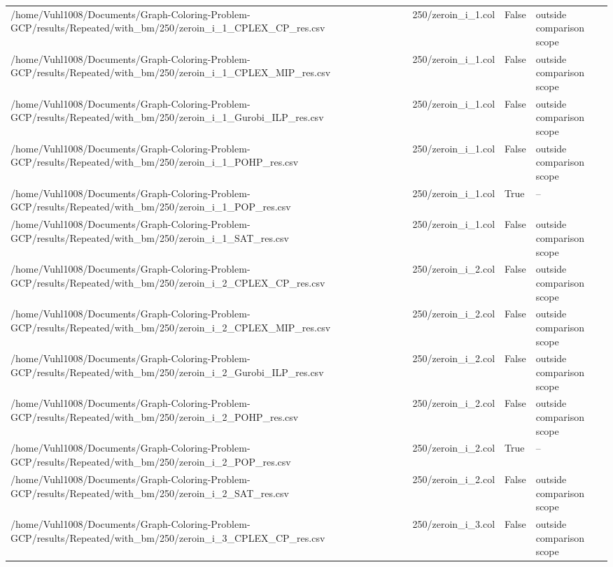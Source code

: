 \begin{table}[htbp]
\begin{tabular}{llll}
/home/Vuhl1008/Documents/Graph-Coloring-Problem-GCP/results/Repeated/with\_bm/250/zeroin\_i\_1\_CPLEX\_CP\_res.csv & 250/zeroin\_i\_1.col & False & outside comparison scope \\
/home/Vuhl1008/Documents/Graph-Coloring-Problem-GCP/results/Repeated/with\_bm/250/zeroin\_i\_1\_CPLEX\_MIP\_res.csv & 250/zeroin\_i\_1.col & False & outside comparison scope \\
/home/Vuhl1008/Documents/Graph-Coloring-Problem-GCP/results/Repeated/with\_bm/250/zeroin\_i\_1\_Gurobi\_ILP\_res.csv & 250/zeroin\_i\_1.col & False & outside comparison scope \\
/home/Vuhl1008/Documents/Graph-Coloring-Problem-GCP/results/Repeated/with\_bm/250/zeroin\_i\_1\_POHP\_res.csv & 250/zeroin\_i\_1.col & False & outside comparison scope \\
/home/Vuhl1008/Documents/Graph-Coloring-Problem-GCP/results/Repeated/with\_bm/250/zeroin\_i\_1\_POP\_res.csv & 250/zeroin\_i\_1.col & True & -- \\
/home/Vuhl1008/Documents/Graph-Coloring-Problem-GCP/results/Repeated/with\_bm/250/zeroin\_i\_1\_SAT\_res.csv & 250/zeroin\_i\_1.col & False & outside comparison scope \\
/home/Vuhl1008/Documents/Graph-Coloring-Problem-GCP/results/Repeated/with\_bm/250/zeroin\_i\_2\_CPLEX\_CP\_res.csv & 250/zeroin\_i\_2.col & False & outside comparison scope \\
/home/Vuhl1008/Documents/Graph-Coloring-Problem-GCP/results/Repeated/with\_bm/250/zeroin\_i\_2\_CPLEX\_MIP\_res.csv & 250/zeroin\_i\_2.col & False & outside comparison scope \\
/home/Vuhl1008/Documents/Graph-Coloring-Problem-GCP/results/Repeated/with\_bm/250/zeroin\_i\_2\_Gurobi\_ILP\_res.csv & 250/zeroin\_i\_2.col & False & outside comparison scope \\
/home/Vuhl1008/Documents/Graph-Coloring-Problem-GCP/results/Repeated/with\_bm/250/zeroin\_i\_2\_POHP\_res.csv & 250/zeroin\_i\_2.col & False & outside comparison scope \\
/home/Vuhl1008/Documents/Graph-Coloring-Problem-GCP/results/Repeated/with\_bm/250/zeroin\_i\_2\_POP\_res.csv & 250/zeroin\_i\_2.col & True & -- \\
/home/Vuhl1008/Documents/Graph-Coloring-Problem-GCP/results/Repeated/with\_bm/250/zeroin\_i\_2\_SAT\_res.csv & 250/zeroin\_i\_2.col & False & outside comparison scope \\
/home/Vuhl1008/Documents/Graph-Coloring-Problem-GCP/results/Repeated/with\_bm/250/zeroin\_i\_3\_CPLEX\_CP\_res.csv & 250/zeroin\_i\_3.col & False & outside comparison scope \\

\end{tabular}
\end{table}
